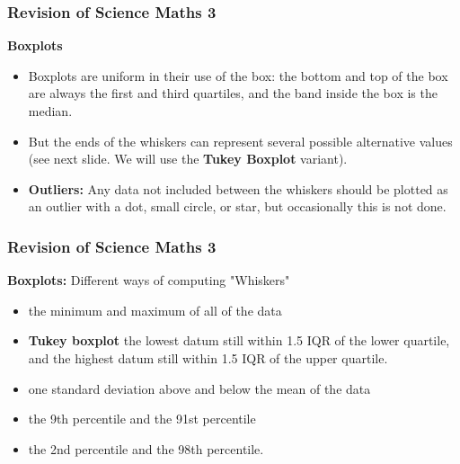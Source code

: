 \documentclass{beamer}
\begin{document}
	
		\begin{frame}
			\frametitle{Revision of Science Maths 3}
			\Large
\textbf{Boxplots}
\begin{itemize}
\item	Boxplots are uniform in their use of the box: the bottom and top of the box are always the first and third quartiles, and the band inside the box is the median. 
\item But the ends of the whiskers can represent several possible alternative values (see next slide. We will use the \textbf{Tukey Boxplot} variant). 
\item \textbf{Outliers:} Any data not included between the whiskers should be plotted as an outlier with a dot, small circle, or star, but occasionally this is not done.
\end{itemize}
\end{frame}
		\begin{frame}
			\frametitle{Revision of Science Maths 3}
			\Large
\textbf{Boxplots:} Different ways of computing "Whiskers"
	\begin{itemize}
		\item
	the minimum and maximum of all of the data
\item \textbf{Tukey boxplot}	the lowest datum still within 1.5 IQR of the lower quartile, and the highest datum still within 1.5 IQR of the upper quartile.
\item	one standard deviation above and below the mean of the data
\item	the 9th percentile and the 91st percentile
\item	the 2nd percentile and the 98th percentile.

\end{itemize}
\end{frame}
	
\end{document}
